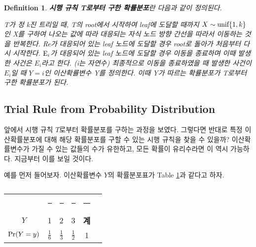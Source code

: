 \documentclass[11pt]{article}
\newtheorem*{definition}{Definition}
\begin{document}
\begin{definition}
\textbf{시행 규칙 T로부터 구한 확률분포}란 다음과 같이 정의된다.

T가 정 k진 트리일 때, T의 root에서 시작하여 leaf에 도달할 때까지 $X \sim \textnormal{unif}\{1, k\}$인 X를 구하여 나오는 값에 따라 대응되는 자식 노드 방향 간선을 따라서 이동하는 것을 반복한다. \textnormal{Re}가 대응되어 있는 leaf 노드에 도달할 경우 root로 돌아가 처음부터 다시 시작한다. $\textnormal{E}_i$가 대응되어 있는 leaf 노드에 도달할 경우 이동을 종료하며 이때 발생한 사건은 $E_{i}$라고 한다. (i는 자연수) 최종적으로 이동을 종료하였을 때 발생한 사건이 $E_{i}$일 때 $Y = i$인 이산확률변수 Y를 정의한다. 이때 Y가 따르는 확률분포가 T로부터 구한 확률분포가 된다.
\end{definition}

\subsection{Trial Rule from Probability Distribution}
앞에서 시행 규칙 $T$로부터 확률분포를 구하는 과정을 보였다. 그렇다면 반대로 특정 이산확률분포에 대해 해당 확률분포를 구할 수 있는 시행 규칙을 찾을 수 있을까? 이산확률변수가 가질 수 있는 값들의 수가 유한하고, 모든 확률이 유리수라면 이 역시 가능하다. 지금부터 이를 보일 것이다. 

예를 먼저 들어보자. 이산확률변수 $Y$의 확률분포표가 Table \ref{tab03}과 같다고 하자.
\\
\begin{table}[h]
\centering
\begin{tabular}{cccccc}
\toprule
 & \rule{0.8cm}{0pt} & \rule{0.3cm}{0pt} & \rule{0.8cm}{0pt} & \rule{0.4cm}{0pt} \\[-\arraystretch\normalbaselineskip]
$Y$ & 1 & 2 & 3 & \textbf{계} \\
\midrule
$\textnormal{Pr}(Y=y)$ & $\displaystyle \frac{1}{6}$ & $\displaystyle \frac{1}{3}$ & $\displaystyle \frac{1}{2}$ & 1 \\
\bottomrule
\end{tabular}
\caption{}
\label{tab03}
\end{table}
\end{document}
